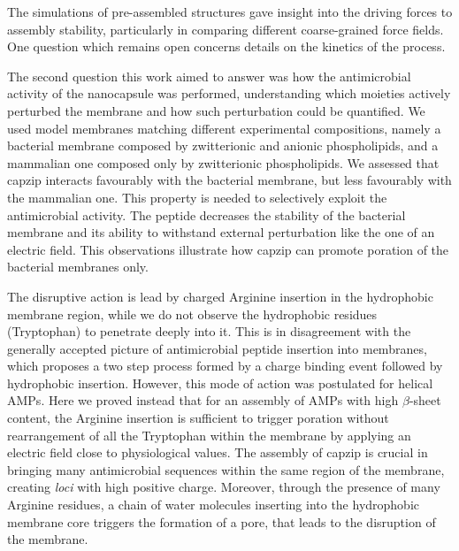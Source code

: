 The simulations of pre-assembled structures gave insight into the driving forces to assembly stability, particularly in comparing different coarse-grained force fields. One question which remains open concerns details on the kinetics of the process.

The second question this work aimed to answer was how the antimicrobial activity of the nanocapsule was performed, understanding which moieties actively perturbed the membrane and how such perturbation could be quantified. We used model membranes matching different experimental compositions, namely a bacterial membrane composed by zwitterionic and anionic phospholipids, and a mammalian one composed only by zwitterionic phospholipids.
%
We assessed that capzip interacts favourably with the bacterial membrane, but less favourably with the mammalian one. This property is needed to selectively exploit the antimicrobial activity.
%
The peptide decreases the stability of the bacterial membrane and its ability to withstand external perturbation like the one of an electric field. This observations illustrate how capzip can promote poration of the bacterial membranes only.

The disruptive action is lead by charged Arginine insertion in the hydrophobic membrane region, while we do not observe the hydrophobic residues (Tryptophan) to penetrate deeply into it.
%
This is in disagreement with the generally accepted picture of antimicrobial peptide insertion into membranes, which proposes a two step process formed by a charge binding event followed by hydrophobic insertion. However, this mode of action was postulated for helical AMPs. Here we proved instead that for an assembly of AMPs with high $\beta$-sheet content, the Arginine insertion is sufficient to trigger poration without rearrangement of all the Tryptophan within the membrane by applying an electric field close to physiological values.
%
The assembly of capzip is crucial in bringing many antimicrobial sequences within the same region of the membrane, creating \emph{loci} with high positive charge. Moreover, through the presence of many Arginine residues, a chain of water molecules inserting into the hydrophobic membrane core triggers the formation of a pore, that leads to the disruption of the membrane.

